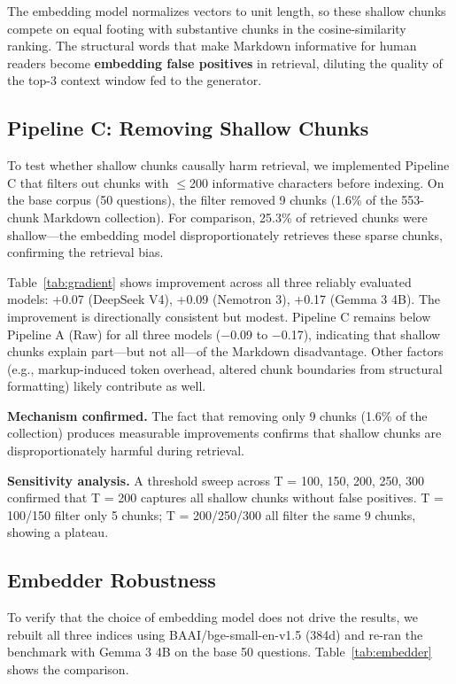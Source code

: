 \documentclass{article}
\begin{document}
The embedding model normalizes vectors to unit length, so these shallow chunks compete on equal footing with substantive chunks in the cosine-similarity ranking. The structural words that make Markdown informative for human readers become \textbf{embedding false positives} in retrieval, diluting the quality of the top-3 context window fed to the generator.

\subsection{Pipeline C: Removing Shallow Chunks}

To test whether shallow chunks causally harm retrieval, we implemented Pipeline C that filters out chunks with $\leq$200 informative characters before indexing. On the base corpus (50 questions), the filter removed 9 chunks (1.6\% of the 553-chunk Markdown collection). For comparison, 25.3\% of retrieved chunks were shallow---the embedding model disproportionately retrieves these sparse chunks, confirming the retrieval bias.

Table~\ref{tab:gradient} shows improvement across all three reliably evaluated models: +0.07 (DeepSeek V4), +0.09 (Nemotron 3), +0.17 (Gemma 3 4B). The improvement is directionally consistent but modest. Pipeline C remains below Pipeline A (Raw) for all three models ($-$0.09 to $-$0.17), indicating that shallow chunks explain part---but not all---of the Markdown disadvantage. Other factors (e.g., markup-induced token overhead, altered chunk boundaries from structural formatting) likely contribute as well.

\textbf{Mechanism confirmed.} The fact that removing only 9 chunks (1.6\% of the collection) produces measurable improvements confirms that shallow chunks are disproportionately harmful during retrieval.

\textbf{Sensitivity analysis.} A threshold sweep across T = 100, 150, 200, 250, 300 confirmed that T = 200 captures all shallow chunks without false positives. T = 100/150 filter only 5 chunks; T = 200/250/300 all filter the same 9 chunks, showing a plateau.

\subsection{Embedder Robustness}

To verify that the choice of embedding model does not drive the results, we rebuilt all three indices using BAAI/bge-small-en-v1.5 (384d) and re-ran the benchmark with Gemma 3 4B on the base 50 questions. Table~\ref{tab:embedder} shows the comparison.
\end{document}
